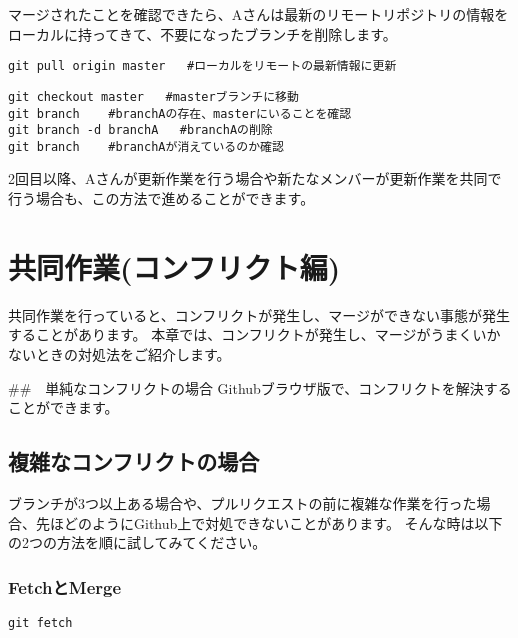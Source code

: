 \documentclass[
]{book}
\begin{document}
マージされたことを確認できたら、Aさんは最新のリモートリポジトリの情報をローカルに持ってきて、不要になったブランチを削除します。

\begin{verbatim}
git pull origin master   #ローカルをリモートの最新情報に更新
\end{verbatim}

\begin{verbatim}
git checkout master   #masterブランチに移動
git branch    #branchAの存在、masterにいることを確認
git branch -d branchA   #branchAの削除
git branch    #branchAが消えているのか確認
\end{verbatim}

2回目以降、Aさんが更新作業を行う場合や新たなメンバーが更新作業を共同で行う場合も、この方法で進めることができます。

\hypertarget{ux5171ux540cux4f5cux696dux30b3ux30f3ux30d5ux30eaux30afux30c8ux7de8}{%
\chapter{共同作業(コンフリクト編)}\label{ux5171ux540cux4f5cux696dux30b3ux30f3ux30d5ux30eaux30afux30c8ux7de8}}

共同作業を行っていると、コンフリクトが発生し、マージができない事態が発生することがあります。
本章では、コンフリクトが発生し、マージがうまくいかないときの対処法をご紹介します。

\#\#　単純なコンフリクトの場合
Githubブラウザ版で、コンフリクトを解決することができます。

\hypertarget{ux8907ux96d1ux306aux30b3ux30f3ux30d5ux30eaux30afux30c8ux306eux5834ux5408}{%
\section{複雑なコンフリクトの場合}\label{ux8907ux96d1ux306aux30b3ux30f3ux30d5ux30eaux30afux30c8ux306eux5834ux5408}}

ブランチが3つ以上ある場合や、プルリクエストの前に複雑な作業を行った場合、先ほどのようにGithub上で対処できないことがあります。
そんな時は以下の2つの方法を順に試してみてください。

\hypertarget{fetchux3068merge}{%
\subsection{FetchとMerge}\label{fetchux3068merge}}

\begin{verbatim}
git fetch
\end{verbatim}
\end{document}
